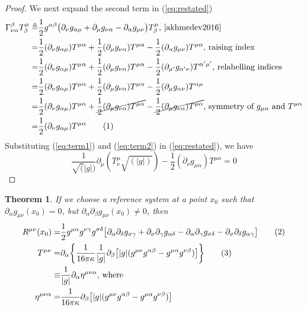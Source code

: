 \documentclass[]{article}
\newtheorem{theorem}{Theorem}
\newcommand\numberthis{\addtocounter{equation}{1}\tag{\theequation}}
\begin{document}
\begin{proof}
	We next expand the second term in (\ref{eq:restated})
	\begin{align*}
	\Gamma^{\beta}_{\nu\alpha}T^{\mu}_{\beta} \triangleq& \frac{1}{2} g^{\alpha\beta} \big( \partial_{\nu}g_{\alpha\mu} + \partial_{\mu}g_{\nu\alpha} - \partial_{\alpha}g_{\mu\nu}\big) T^{\mu}_{\beta}\text{, \cite[(45)]{akhmedev2016}}\\
	=&\frac{1}{2} (\partial_{\nu}g_{\alpha\mu})T^{\mu\alpha} + \frac{1}{2}  (\partial_{\mu}g_{\nu\alpha})T^{\mu\alpha} - \frac{1}{2}  (\partial_{\alpha}g_{\mu\nu}) T^{\mu\alpha}\text{, raising index}\\
	=&\frac{1}{2} (\partial_{\nu}g_{\alpha\mu})T^{\mu\alpha} + \frac{1}{2}  (\partial_{\mu}g_{\nu\alpha})T^{\mu\alpha} - \frac{1}{2}  (\partial_{\mu'}g_{\alpha'\nu}) T^{\alpha'\mu'}\text{, relabelling indices}\\
	=&\frac{1}{2} (\partial_{\nu}g_{\alpha\mu})T^{\mu\alpha} + \frac{1}{2}  (\partial_{\mu}g_{\nu\alpha})T^{\mu\alpha} - \frac{1}{2}  (\partial_{\mu}g_{\alpha\nu}) T^{\alpha\mu}\\
	=&\frac{1}{2} (\partial_{\nu}g_{\alpha\mu})T^{\mu\alpha} + \cancel{\frac{1}{2}  (\partial_{\mu}g_{\nu\alpha})T^{\mu\alpha}} - \cancel{\frac{1}{2}  (\partial_{\mu}g_{\nu\alpha}) T^{\mu\alpha}}\text{, symmetry of $g_{\mu\alpha}$ and $T^{\mu\alpha}$}\\
	=&\frac{1}{2} (\partial_{\nu}g_{\alpha\mu})T^{\mu\alpha} \numberthis\label{eq:term2}
	\end{align*}
	Substituting (\ref{eq:term1}) and (\ref{eq:term2}) in (\ref{eq:restated}), we have
	\begin{equation*}
	\frac{1}{\sqrt(|g|)}\partial_{\mu}(T^{\mu}_{\nu}\sqrt{(|g|)}) - \frac{1}{2}(\partial_{\nu}g_{\mu\alpha})T^{\mu\alpha}=0
	\end{equation*}
\end{proof}

\begin{theorem}
	If we choose a reference system at a point $x_0$ such that $\partial_{\alpha}g_{\mu\nu}(x_0)=0$, but $\partial_{\alpha}\partial_{\beta}g_{\mu\nu}(x_0)\neq0$, then
	\begin{align*}
	R^{\mu\nu}(x_0) = & \frac{1}{2}g^{\mu\alpha}g^{\nu\gamma}g^{\sigma\delta}\big[\partial_{\alpha}\partial_{\delta}g_{\sigma\gamma} + \partial_{\sigma}\partial_{\gamma}g_{\alpha\delta} - \partial_{\alpha}\partial_{\gamma}g_{\sigma\delta} - \partial_{\sigma}\partial_{\delta}g_{\alpha\gamma}\big] \numberthis\label{eq:R} \\
	T^{\mu\nu} =& \partial_{\alpha}\bigg\{ \frac{1}{16\pi\kappa}\frac{1}{|g|}\partial_{\beta}\big[|g|(g^{\mu\nu}g^{\alpha\beta}-g^{\mu\alpha}g^{\nu\beta})\big]\bigg\} \numberthis  \label{eq:T} \\
	\equiv& \frac{1}{|g|}\partial_{\alpha}\eta^{\mu\nu\alpha} \text{, where}\\
	\eta^{\mu\nu\alpha} =& \frac{1}{16\pi\kappa} \partial_{\beta} \big[|g|(g^{\mu\nu}g^{\alpha\beta}-g^{\mu\alpha}g^{\nu\beta})\big]
	\end{align*}
\end{theorem}
\end{document}
